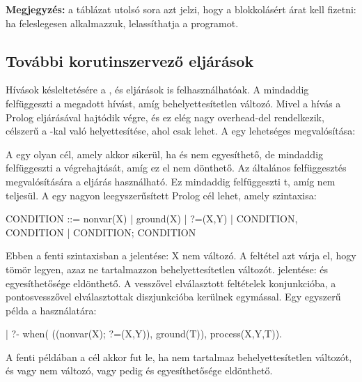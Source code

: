 {\bf Megjegyzés:} a táblázat utolsó sora azt jelzi, hogy a
blokkolásért árat kell fizetni: ha feleslegesen alkalmazzuk,
lelassíthatja a programot.

\subsection{További korutinszervező eljárások}

Hívások késleltetésére a ,  és  eljárások
is felhasználhatóak. A  mindaddig felfüggeszti a
megadott hívást, amíg  behelyettesítetlen változó. Mivel a hívás a
Prolog  eljárásával hajtódik végre, és ez elég nagy overhead-del
rendelkezik, célszerű a  -kal való helyettesítése, ahol
csak lehet. A  egy lehetséges megvalósítása:


A 
egy olyan cél, amely akkor sikerül, ha  és  nem egyesíthető, de
mindaddig felfüggeszti a végrehajtását, amíg ez el nem dönthető. Az általános
felfüggesztés megvalósítására a  eljárás használható.
Ez mindaddig felfüggeszti t, amíg  nem teljesül. A
 egy nagyon leegyszerűsített Prolog cél lehet, amely szintaxisa:

\begin{prologcode}
    CONDITION ::=  nonvar(X) | ground(X) | ?=(X,Y) |
                   CONDITION, CONDITION |
                   CONDITION; CONDITION
\end{prologcode}

Ebben a fenti szintaxisban a  jelentése: X nem változó. A
 feltétel azt várja el, hogy  tömör legyen, azaz ne
tartalmazzon behelyettesítetlen változót.  jelentése:
 és  egyesíthetősége eldönthető. A vesszővel elválasztott
feltételek konjunkcióba, a pontosvesszővel elválasztottak diszjunkcióba
kerülnek egymással. Egy egyszerű példa a  használatára:

\begin{prologcode}
| ?- when( ((nonvar(X); ?=(X,Y)), ground(T)), process(X,Y,T)).
\end{prologcode}

A fenti példában a  cél akkor fut le, ha  nem
tartalmaz behelyettesítetlen változót, és vagy  nem változó, vagy
pedig  és  egyesíthetősége eldönthető.

